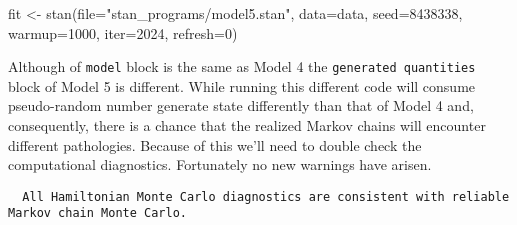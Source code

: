 \documentclass[
  letterpaper,
  DIV=11,
  numbers=noendperiod]{scrartcl}
\newenvironment{Shaded}{\begin{snugshade}}{\end{snugshade}}
\newcommand{\AttributeTok}[1]{\textcolor[rgb]{0.40,0.45,0.13}{#1}}
\newcommand{\DecValTok}[1]{\textcolor[rgb]{0.68,0.00,0.00}{#1}}
\newcommand{\FunctionTok}[1]{\textcolor[rgb]{0.28,0.35,0.67}{#1}}
\newcommand{\NormalTok}[1]{\textcolor[rgb]{0.00,0.23,0.31}{#1}}
\newcommand{\OtherTok}[1]{\textcolor[rgb]{0.00,0.23,0.31}{#1}}
\newcommand{\SpecialCharTok}[1]{\textcolor[rgb]{0.37,0.37,0.37}{#1}}
\newcommand{\StringTok}[1]{\textcolor[rgb]{0.13,0.47,0.30}{#1}}
\begin{document}
\begin{Shaded}
\begin{Highlighting}[]
\NormalTok{fit }\OtherTok{\textless{}{-}} \FunctionTok{stan}\NormalTok{(}\AttributeTok{file=}\StringTok{"stan\_programs/model5.stan"}\NormalTok{,}
            \AttributeTok{data=}\NormalTok{data, }\AttributeTok{seed=}\DecValTok{8438338}\NormalTok{,}
            \AttributeTok{warmup=}\DecValTok{1000}\NormalTok{, }\AttributeTok{iter=}\DecValTok{2024}\NormalTok{, }\AttributeTok{refresh=}\DecValTok{0}\NormalTok{)}
\end{Highlighting}
\end{Shaded}

Although of \texttt{model} block is the same as Model 4 the
\texttt{generated\ quantities} block of Model 5 is different. While
running this different code will consume pseudo-random number generate
state differently than that of Model 4 and, consequently, there is a
chance that the realized Markov chains will encounter different
pathologies. Because of this we'll need to double check the
computational diagnostics. Fortunately no new warnings have arisen.

\begin{Shaded}
\end{Shaded}

\begin{verbatim}
  All Hamiltonian Monte Carlo diagnostics are consistent with reliable
Markov chain Monte Carlo.
\end{verbatim}

\begin{Shaded}
\end{Shaded}
\end{document}
